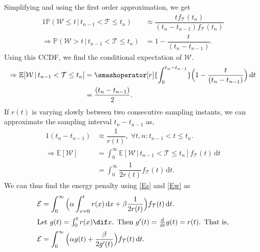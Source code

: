 Simplifying and using the first order approximation, we get
\begin{alignat*}{1}
\mathbb{P}(\mathcal{W}\leq t\,\big\vert\,t_{n-1}<\mathcal{T}\leq t_n)&\approx\dfrac{tf_\mathcal{T}(t_n)}{(t_{n}-t_{n-1})f_\mathcal{T}(t_n)}\tag{$A_2$}\label{Apx2}\\
\Rightarrow\mathbb{P}(\mathcal{W}> t\,|\,t_{n-1}<\mathcal{T}\leq t_n)&= 1-\dfrac{t}{(t_{n}-t_{n-1})}.
\end{alignat*}
Using this CCDF, we find the conditional expectation of $\mathcal{W}$.
\begin{alignat*}{1}
\Rightarrow \mathbb{E}[\mathcal{W}\,|\,t_{n-1}<\mathcal{T}\leq t_n]&=\smashoperator[r]{\int_{0}^{t_n-t_{n-1}}}\Big(1-\dfrac{t}{(t_{n}-t_{n-1})}\Big)\,\mathrm{d}t\\
&=\dfrac{(t_n-t_{n-1})}{2}.
\end{alignat*}
If $r(t)$ is varying slowly between two consecutive sampling instants, we can approximate the sampling interval $t_n\!-\!t_{n-1}$ as,
\begin{alignat}{1}
 (t_n-t_{n-1})&\approx\dfrac{1}{r(t)},\;\forall t,n:t_{n-1}\!<\!t\!\leq\!t_n.\tag{$A_3$}\label{Apx3}\\
\Rightarrow \mathbb{E}[\mathcal{W}]&=\int_{0}^{\infty}\mathbb{E}[\mathcal{W}\,|\,t_{n-1}<\mathcal{T}\leq t_n]f_\mathcal{T}(t)\,\mathrm{d}t\nonumber\\
&=\int_{0}^{\infty}\dfrac{1}{2r(t)}f_\mathcal{T}(t)\,\mathrm{d}t.\label{Ew}
\end{alignat}
We can thus find the energy penalty using \eqref{Es} and \eqref{Ew} as
\begin{alignat*}{1}
\mathcal{E}&=\int_{0}^{\infty}\Big(\alpha\int_{x=0}^{t}r(x)\,\mathrm{d}x+\beta\dfrac{1}{2r(t)}\Big)f_{\mathcal{T}}(t)\,\mathrm{d}t.\label{epsilon_eulerForm}\\
\intertext{Let $g(t)=\int_{0}^{t}r(x)\dif x$. Then  $g'(t)=\tfrac{\mathrm{d}}{\mathrm{d}t}g(t)=r(t)$. That is,}
\vspace{-4cm}\mathcal{E}&=\int_{0}^{\infty}\Big(\alpha g(t)+\dfrac{\beta}{2g'(t)}\Big)f_{\mathcal{T}}(t)\,\mathrm{d}t.
\end{alignat*}
